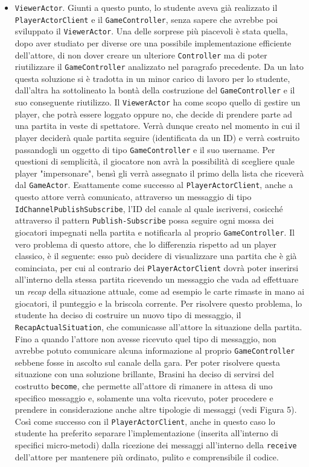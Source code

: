 \begin{itemize}
     \item \texttt{ViewerActor}.
     Giunti a questo punto, lo studente aveva già realizzato il \texttt{PlayerActorClient} e il \texttt{GameController}, senza sapere che avrebbe poi sviluppato il \texttt{ViewerActor}. Una delle sorprese più piacevoli è stata quella, dopo aver studiato per diverse ore una possibile implementazione efficiente dell'attore, di non dover creare un ulteriore \texttt{Controller} ma di poter riutilizzare il \texttt{GameController} analizzato nel paragrafo precedente. Da un lato questa soluzione si è tradotta in un minor carico di lavoro per lo studente, dall'altra ha sottolineato la bontà della costruzione del \texttt{GameController} e il suo conseguente riutilizzo. Il \texttt{ViewerActor} ha come scopo quello di gestire un player, che potrà essere loggato oppure no, che decide di prendere parte ad una partita in veste di spettatore. Verrà dunque creato nel momento in cui il player deciderà quale partita seguire (identificata da un ID) e verrà costruito passandogli un oggetto di tipo \texttt{GameController} e il suo username. Per questioni di semplicità, il giocatore non avrà la possibilità di scegliere quale player "impersonare", bensì gli verrà assegnato il primo della lista che riceverà dal \texttt{GameActor}. Esattamente come successo al \texttt{PlayerActorClient}, anche a questo attore verrà comunicato, attraverso un messaggio di tipo \texttt{IdChannelPublishSubscribe}, l'ID del canale al quale iscriversi, cosicché attraverso il pattern \texttt{Publish-Subscribe} possa seguire ogni mossa dei giocatori impegnati nella partita e notificarla al proprio \texttt{GameController}. Il vero problema di questo attore, che lo differenzia rispetto ad un player classico, è il seguente: esso può decidere di visualizzare una partita che è già cominciata, per cui al contrario dei \texttt{PlayerActorClient} dovrà poter inserirsi all'interno della stessa partita ricevendo un messaggio che vada ad effettuare un \textit{recap} della situazione attuale, come ad esempio le carte rimaste in mano ai giocatori, il punteggio e la briscola corrente. Per risolvere questo problema, lo studente ha deciso di costruire un nuovo tipo di messaggio, il \texttt{RecapActualSituation}, che comunicasse all'attore la situazione della partita. Fino a quando l'attore non avesse ricevuto quel tipo di messaggio, non avrebbe potuto comunicare alcuna informazione al proprio \texttt{GameController} sebbene fosse in ascolto sul canale della gara. Per poter risolvere questa situazione con una soluzione brillante, Brasini ha deciso di servirsi del costrutto \texttt{become}, che permette all'attore di rimanere in attesa di uno specifico messaggio e, solamente una volta ricevuto, poter procedere e prendere in considerazione anche altre tipologie di messaggi (vedi Figura 5). Così come successo con il \texttt{PlayerActorClient}, anche in questo caso lo studente ha preferito separare l'implementazione (inserita all'interno di specifici micro-metodi) dalla ricezione dei messaggi all'interno della \texttt{receive} dell'attore per mantenere più ordinato, pulito e comprensibile il codice.



\end{itemize}

